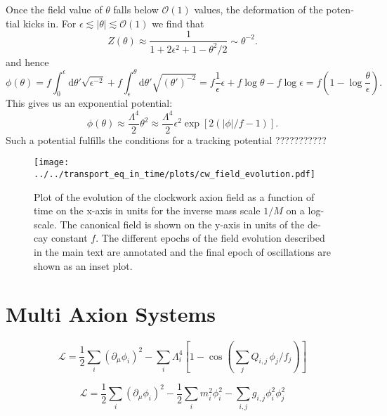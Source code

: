 \documentclass[master,       %
               twoside,        %
               BCOR10mm,       %
               english,ngerman, %
               ]{GAUBM}
\begin{document}
\begin{otherlanguage}{english}
Once the field value of $\theta$ falls below $\mathcal{O}(1)$ values, the deformation of the potential kicks in.
For $\epsilon \lesssim |\theta| \lesssim \mathcal{O}(1)$ we find that
\begin{equation}
	Z(\theta) \approx \frac{1}{1 + 2\epsilon^2 + 1 - \theta^2/2} \sim \theta^{-2}.
\end{equation}
and hence
\begin{equation}
	\phi(\theta) = f \int_0^\epsilon \mathrm{d} \theta' \sqrt{\epsilon^{-2}} + f \int_\epsilon^\theta \mathrm{d} \theta' \sqrt{ (\theta')^{-2}} = f \frac{1}{\epsilon} \epsilon + f \log \theta - f \log \epsilon = f \left(1 - \log \frac{\theta}{\epsilon}\right).
\end{equation}
This gives us an exponential potential:
\begin{equation}
	\phi(\theta) \approx \frac{\Lambda^4}{2} \theta^2 \approx \frac{\Lambda^4}{2} \epsilon^2 \exp \left[ 2 ( | \phi | / f - 1 ) \right].
\end{equation}
Such a potential fulfills the conditions for a tracking potential ???????????



\begin{figure}[H]
    \texttt{[image: ../../transport\_eq\_in\_time/plots/cw\_field\_evolution.pdf]}
    \caption{Plot of the evolution of the clockwork axion field as a function of time on the x-axis in units for the inverse mass scale $1/M$ on a log-scale. The canonical field is shown on the y-axis in units of the decay constant $f$. The different epochs of the field evolution described in the main text are annotated and the final epoch of oscillations are shown as an inset plot.}
\end{figure}


\section{Multi Axion Systems}

\begin{equation}
	\mathcal{L} = \frac{1}{2} \sum_i \left( \partial_\mu \phi_i \right)^2 - \sum_i \Lambda_i^4 \left[ 1 - \cos \left( \sum_j Q_{i,j} \, \phi_j / f_j \right) \right]
\end{equation}

\begin{equation}
	\mathcal{L} = \frac{1}{2} \sum_i \left( \partial_\mu \phi_i \right)^2 - \frac{1}{2} \sum_i m_i^2 \phi_i^2 - \sum_{i, j}
	g_{i, j} \phi_i^2 \phi_j^2
\end{equation}


\end{otherlanguage}
\end{document}
